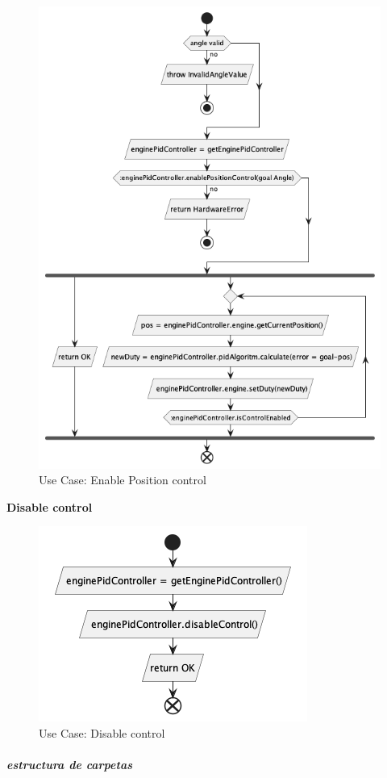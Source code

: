 \begin{figure}[H]
    \centering
    \includegraphics[height=0.4\textheight]{./part/Proyecto_ejecutivo/memoria_descriptiva/descripcionDelProyecto/control/uml/enablePositionControl}
    \caption{Use Case: Enable Position control}\label{fig:Use Case- Enable Position control}
\end{figure}

\textbf{Disable control}

\begin{figure}[H]
    \centering
    \includegraphics[height=0.2\textheight]{./part/Proyecto_ejecutivo/memoria_descriptiva/descripcionDelProyecto/control/uml/disableControl}
    \caption{Use Case: Disable control}\label{fig:Use Case- Disable control}
\end{figure}

\newpage
\subparagraph{estructura de carpetas}







